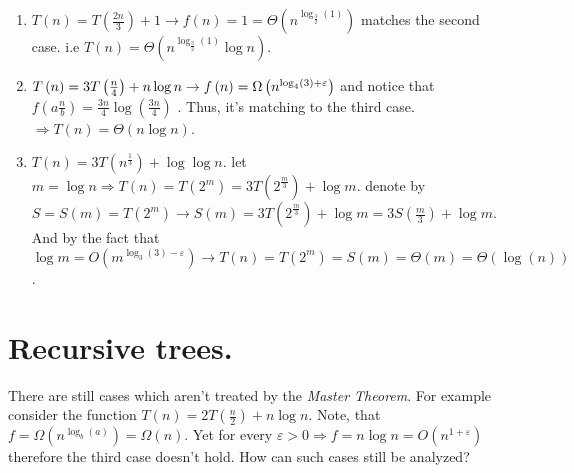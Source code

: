 \begin{example} 
\begin{enumerate}
    \item \( T\left(n\right) =  T\left(\frac{2n}{3}\right) + 1 \rightarrow f\left(n\right) = 1 =\Theta \left( n^{\log_{\frac{3}{2}} \left(1\right)}\right)\) matches the second case. i.e  \( T\left(n\right) = \Theta \left( n^{\log_{\frac{3}{2}} \left(1\right)}\log n \right)\).
    
    \item \( T\left(n\right) = 3 T\left(\frac{n}{4}\right) + n\log n \rightarrow f\left(n\right) = \Omega\left( n^{\log_{4}\left(3\right) + \varepsilon}  \right) \) and notice that \( f\left( a\frac{n}{b}\right) = \frac{3n}{4}\log\left(\frac{3n}{4}\right)\) . Thus, it's matching to the third case. \(\Rightarrow T\left(n\right) = \Theta\left(n\log n\right)\).
    
    \item \(T\left(n\right) = 3T\left( n^{\frac{1}{3}}\right) + \log\log n\). let \( m = \log n \Rightarrow T\left( n\right) = T \left(2^m \right) = 3T\left(2^{\frac{m}{3}} \right) + \log m\). denote by \(S = S\left(m\right) = T\left(2^m\right) \rightarrow S\left(m\right) = 3T\left(2^{\frac{m}{3}} \right) + \log m = 3S\left(\frac{m}{3} \right) + \log m\). And by the fact that \(\log m = O\left(m^{\log_{3}\left(3\right)-\varepsilon} \right) \rightarrow T\left(n\right) = T\left(2^m\right) = S\left(m\right) = \Theta\left(m\right) = \Theta\left( \log(n)\right) \).  
\end{enumerate}
\end{example}

\section{Recursive trees.}
There are still cases which aren't treated by the \textit{Master Theorem}. For example consider the function \(T\left(n\right) = 2T\left(\frac{n}{2}\right) + n\log n \). Note, that \(f = \Omega\left( n^{\log_{b}(a)} \right) = \Omega\left(n\right)\). Yet for every \( \varepsilon > 0 \Rightarrow f = n\log n = O\left( n^{1+\varepsilon} \right) \) therefore the third case  doesn't hold. How can such cases still be analyzed? 

